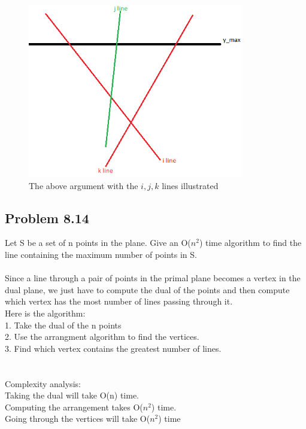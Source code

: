 \documentclass[11pt,psfig]{article}
\begin{document}
\begin{figure}[H]
\centering
\includegraphics[height=3in]{hw2prob8_4_diagram.png}
\caption{The above argument with the $i,j,k$ lines illustrated}
\end{figure} 

\subsection*{Problem 8.14}

Let S be a set of n points in the plane. Give an O($n^2$) time algorithm to
find the line containing the maximum number of points in S.
\\
\\
Since a line through a pair of points in the primal plane becomes a vertex in the dual plane, we just have to compute the dual of the points and then compute which vertex has the most number of lines passing through it. 
\\
Here is the algorithm:\\
1. Take the dual of the n points\\
2. Use the arrangment algorithm to find the vertices. \\
3. Find which vertex contains the greatest number of lines. \\
\\
\\
Complexity analysis:\\
Taking the dual will take O(n) time. \\
Computing the arrangement takes O($n^2$) time. \\
Going through the vertices will take O($n^2$) time


\end{document}
